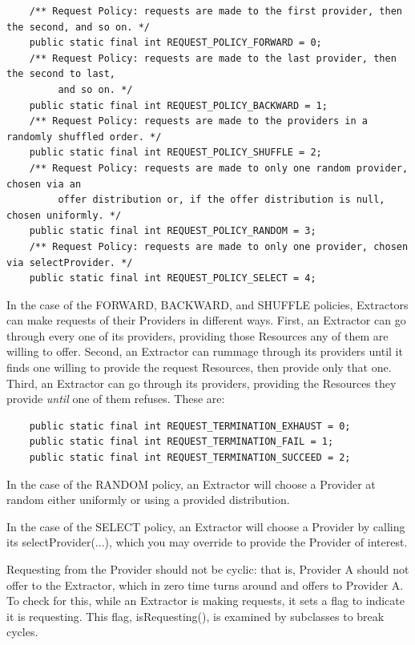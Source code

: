\documentclass[twoside,10pt]{article}
\begin{document}
\begin{verbatim}
    /** Request Policy: requests are made to the first provider, then the second, and so on. */
    public static final int REQUEST_POLICY_FORWARD = 0;
    /** Request Policy: requests are made to the last provider, then the second to last, 
         and so on. */
    public static final int REQUEST_POLICY_BACKWARD = 1;	
    /** Request Policy: requests are made to the providers in a randomly shuffled order. */
    public static final int REQUEST_POLICY_SHUFFLE = 2;
    /** Request Policy: requests are made to only one random provider, chosen via an 
         offer distribution or, if the offer distribution is null, chosen uniformly. */
    public static final int REQUEST_POLICY_RANDOM = 3;
    /** Request Policy: requests are made to only one provider, chosen via selectProvider. */
    public static final int REQUEST_POLICY_SELECT = 4;
\end{verbatim}

In the case of the FORWARD, BACKWARD, and SHUFFLE policies, Extractors can make requests of their Providers in different ways. First, an Extractor can go through every one of its providers, providing those Resources any of them are willing to offer. Second, an Extractor can rummage through its providers until it finds one willing to provide the request Resources, then provide only that one.  Third, an Extractor can go through its providers, providing the Resources they provide {\it until} one of them refuses.    These are:

\begin{verbatim}
    public static final int REQUEST_TERMINATION_EXHAUST = 0;
    public static final int REQUEST_TERMINATION_FAIL = 1;
    public static final int REQUEST_TERMINATION_SUCCEED = 2;
\end{verbatim}

In the case of the RANDOM policy, an Extractor will choose a Provider at random either uniformly or using a provided distribution.

In the case of the SELECT policy, an Extractor will choose a Provider by calling its selectProvider(...), which you may override to provide the Provider of interest.

Requesting from the Provider should not be cyclic: that is, Provider A should not offer to the Extractor, which in zero time turns around and offers to Provider A.  To check for this, while an Extractor is making requests, it sets a flag to indicate it is requesting.  This flag, isRequesting(), is examined by subclasses to break cycles.
\end{document}
